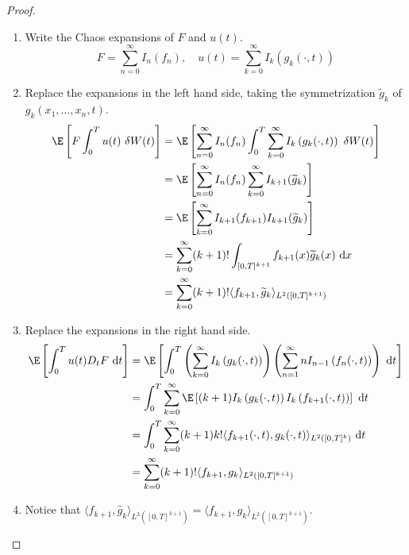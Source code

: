 \begin{proof}
	\begin{enumerate}
	\item Write the Chaos expansions of $F$ and $u(t)$.
		\[
		F = \sum_{n=0}^\infty I_n(f_n), \quad u(t) = \sum_{k=0}^\infty I_k(g_k(\cdot, t))
		\]
	\item Replace the expansions in the left hand side, taking the symmetrization $\widetilde{g}_k$ of $g_k(x_1, \ldots, x_n, t)$.
	\begin{equation*}
	\begin{aligned}
		\E \left[F \int_0^T u(t) ~\delta W(t)\right] & = \E\left[\sum_{n=0}^{\infty} I_n(f_n) \int_0^T \sum_{k=0}^{\infty} I_k\left(g_k(\cdot, t)\right) ~\delta W(t)\right] \\
		& = \E \left[\sum_{n=0}^{\infty} I_n(f_n) \sum_{k=0}^{\infty} I_{k+1}(\widetilde{g}_k)\right] \\
		& = \E \left[\sum_{k=0}^{\infty} I_{k+1}(f_{k+1}) I_{k+1}(\widetilde{g}_k)\right] \\
		& =\sum_{k=0}^{\infty}(k+1) ! \int_{[0, T]^{k+1}} f_{k+1}(x) \widetilde{g}_k(x) ~\mathrm{d} x \\
		& =\sum_{k=0}^{\infty}(k+1) ! \langle f_{k+1}, \widetilde{g}_k \rangle_{L^2([0, T]^{k+1})}
	\end{aligned}
	\end{equation*}
	\item Replace the expansions in the right hand side.
	\begin{equation*}
	\begin{aligned}
		\E \left[\int_0^T u(t) D_t F ~\mathrm{d} t\right] & = \E\left[\int_0^T\left(\sum_{k=0}^{\infty} I_k\left(g_k(\cdot, t)\right)\right)\left(\sum_{n=1}^{\infty} n I_{n-1}\left(f_n(\cdot, t)\right)\right) ~\mathrm{d} t\right] \\
		& =\int_0^T \sum_{k=0}^{\infty} \E\left[(k+1) I_k\left(g_k(\cdot, t)\right) I_k\left(f_{k+1}(\cdot, t)\right)\right] ~\mathrm{d} t \\
		& =\int_0^T \sum_{k=0}^{\infty}(k+1) k !\langle f_{k+1}(\cdot, t), g_k(\cdot, t)\rangle_{L^2\left([0, T]^k\right)} ~\mathrm{d} t \\
		& =\sum_{k=0}^{\infty}(k+1) !\langle f_{k+1}, g_k\rangle_{L^2\left([0, T]^{k+1}\right)}
	\end{aligned}
	\end{equation*}
	\item Notice that $\langle f_{k+1}, \hat{g}_k \rangle_{L^2([0,T]^{k+1})} = \langle f_{k+1}, g_k \rangle_{L^2([0,T]^{k+1})}$.
		\begin{equation*}

\end{equation*}
\end{enumerate}
\end{proof}
